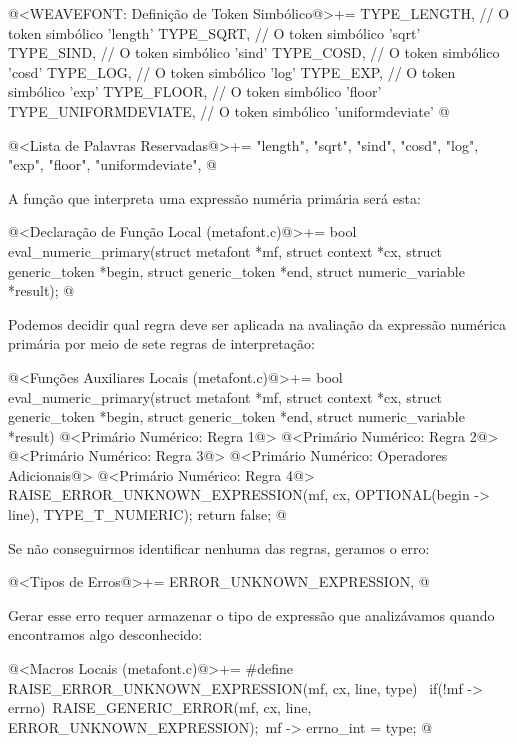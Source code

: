 \iniciocodigo
@<WEAVEFONT: Definição de Token Simbólico@>+=
TYPE_LENGTH,         // O token simbólico 'length'
TYPE_SQRT,           // O token simbólico 'sqrt'
TYPE_SIND,           // O token simbólico 'sind'
TYPE_COSD,           // O token simbólico 'cosd'
TYPE_LOG,            // O token simbólico 'log'
TYPE_EXP,            // O token simbólico 'exp'
TYPE_FLOOR,          // O token simbólico 'floor'
TYPE_UNIFORMDEVIATE, // O token simbólico 'uniformdeviate'
@
\fimcodigo

\iniciocodigo
@<Lista de Palavras Reservadas@>+=
"length", "sqrt", "sind", "cosd", "log", "exp", "floor", "uniformdeviate",
@
\fimcodigo

A função que interpreta uma expressão numéria primária será esta:

\iniciocodigo
@<Declaração de Função Local (metafont.c)@>+=
bool eval_numeric_primary(struct metafont *mf, struct context *cx,
                          struct generic_token *begin,
                          struct generic_token *end,
                          struct numeric_variable *result);
@
\fimcodigo

Podemos decidir qual regra deve ser aplicada na avaliação da expressão
numérica primária por meio de sete regras de interpretação:

\iniciocodigo
@<Funções Auxiliares Locais (metafont.c)@>+=
bool eval_numeric_primary(struct metafont *mf, struct context *cx,
                          struct generic_token *begin,
                          struct generic_token *end,
                          struct numeric_variable *result){
  @<Primário Numérico: Regra 1@>
  @<Primário Numérico: Regra 2@>
  @<Primário Numérico: Regra 3@>
  @<Primário Numérico: Operadores Adicionais@>
  @<Primário Numérico: Regra 4@>
  RAISE_ERROR_UNKNOWN_EXPRESSION(mf, cx, OPTIONAL(begin -> line),
                                 TYPE_T_NUMERIC);
  return false;
}
@

Se não conseguirmos identificar nenhuma das regras, geramos o erro:

\iniciocodigo
@<Tipos de Erros@>+=
ERROR_UNKNOWN_EXPRESSION,
@
\fimcodigo

Gerar esse erro requer armazenar o tipo de expressão que analizávamos
quando encontramos algo desconhecido:

\iniciocodigo
@<Macros Locais (metafont.c)@>+=
#define RAISE_ERROR_UNKNOWN_EXPRESSION(mf, cx, line, type) {\
  if(!mf -> errno){\
    RAISE_GENERIC_ERROR(mf, cx, line, ERROR_UNKNOWN_EXPRESSION);\
    mf -> errno_int = type;}}
@
\fimcodigo


